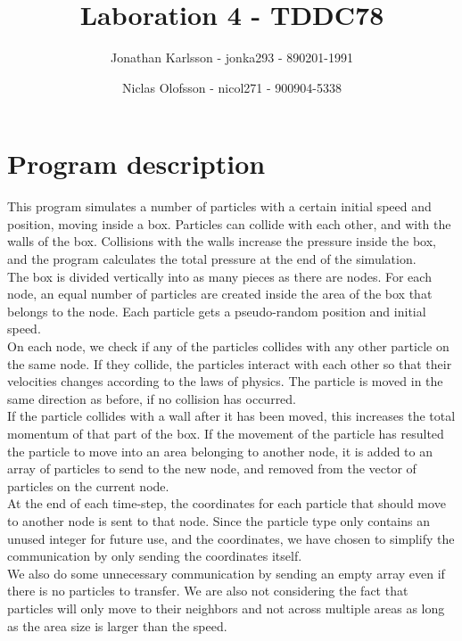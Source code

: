 \documentclass[a4paper]{article}
\author{Jonathan Karlsson - jonka293 - 890201-1991 \and Niclas Olofsson - nicol271 - 900904-5338}
\title{Laboration 4 - TDDC78}
\begin{document}
\maketitle

\section{Program description}
This program simulates a number of particles with a certain initial
speed and position, moving inside a box. Particles can collide with each
other, and with the walls of the box. Collisions with the walls increase
the pressure inside the box, and the program calculates the total pressure
at the end of the simulation.\\

The box is divided vertically into as many pieces as there are nodes.
For each node, an equal number of particles are created inside the area
of the box that belongs to the node. Each particle gets a pseudo-random
position and initial speed.\\

On each node, we check if any of the particles collides with any other
particle on the same node. If they collide, the particles interact with
each other so that their velocities changes according to the laws of
physics. The particle is moved in the same direction as before, if no
collision has occurred.\\

If the particle collides with a wall after it has been moved, this
increases the total momentum of that part of the box. If the movement
of the particle has resulted the particle to move into an area belonging
to another node, it is added to an array of particles to send to the new
node, and removed from the vector of particles on the current node.\\

At the end of each time-step, the coordinates for each particle that
should move to another node is sent to that node. Since the particle
type only contains an unused integer for future use, and the
coordinates, we have chosen to simplify the communication by only
sending the coordinates itself.\\

We also do some unnecessary communication by sending an empty array even
if there is no particles to transfer. We are also not considering the
fact that particles will only move to their neighbors and not across
multiple areas as long as the area size is larger than the speed.\\
\end{document}
